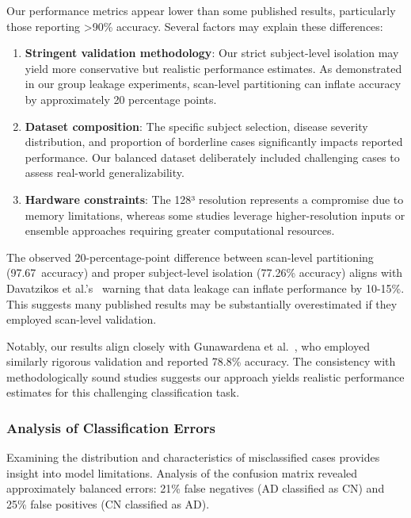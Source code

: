\documentclass[12pt, a4paper]{article}
\begin{document}

Our performance metrics appear lower than some published results, particularly those reporting >90\% accuracy. Several factors may explain these differences:

\begin{enumerate}
    \item \textbf{Stringent validation methodology}: Our strict subject-level isolation may yield more conservative but realistic performance estimates. As demonstrated in our group leakage experiments, scan-level partitioning can inflate accuracy by approximately 20 percentage points.
    
    \item \textbf{Dataset composition}: The specific subject selection, disease severity distribution, and proportion of borderline cases significantly impacts reported performance. Our balanced dataset deliberately included challenging cases to assess real-world generalizability.
    
    \item \textbf{Hardware constraints}: The 128³ resolution represents a compromise due to memory limitations, whereas some studies leverage higher-resolution inputs or ensemble approaches requiring greater computational resources.
\end{enumerate}

The observed 20-percentage-point difference between scan-level partitioning (97.67\ accuracy) and proper subject-level isolation (77.26\% accuracy) aligns with Davatzikos et al.'s~\cite{davatzikos2019machine} warning that data leakage can inflate performance by 10-15\%. This suggests many published results may be substantially overestimated if they employed scan-level validation.

Notably, our results align closely with Gunawardena et al.~\cite{gunawardena2017applying}, who employed similarly rigorous validation and reported 78.8\% accuracy. The consistency with methodologically sound studies suggests our approach yields realistic performance estimates for this challenging classification task.

\subsubsection{Analysis of Classification Errors}

Examining the distribution and characteristics of misclassified cases provides insight into model limitations. Analysis of the confusion matrix revealed approximately balanced errors: 21\% false negatives (AD classified as CN) and 25\% false positives (CN classified as AD).
\end{document}
